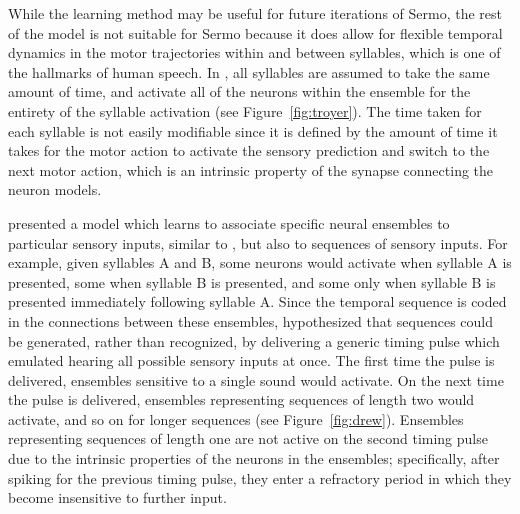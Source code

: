 
While the learning method
may be useful for future iterations of Sermo,
the rest of the model is not suitable for Sermo
because it does allow for
flexible temporal dynamics
in the motor trajectories within and between syllables,
which is one of the hallmarks of human speech.
In \citet{troyer2000},
all syllables are assumed
to take the same amount of time,
and activate all of the neurons
within the ensemble for the entirety
of the syllable activation
(see Figure~\ref{fig:troyer}).
The time taken for each syllable
is not easily modifiable since
it is defined by the amount of time
it takes for the motor action
to activate the sensory prediction
and switch to the next motor action,
which is an intrinsic property
of the synapse connecting the neuron models.

\citet{drew2003} presented a model
which learns to associate specific neural ensembles
to particular sensory inputs,
similar to \citet{troyer2000},
but also to sequences of sensory inputs.
For example, given syllables A and B,
some neurons would activate
when syllable A is presented,
some when syllable B is presented,
and some only when syllable B is presented
immediately following syllable A.
Since the temporal sequence is
coded in the connections between
these ensembles,
\citeauthor{drew2003} hypothesized that
sequences could be generated,
rather than recognized,
by delivering a generic timing pulse
which emulated hearing all possible sensory
inputs at once.
The first time the pulse is delivered,
ensembles sensitive to a single sound
would activate.
On the next time the pulse is delivered,
ensembles representing sequences of length two
would activate, and so on for longer sequences
(see Figure~\ref{fig:drew}).
Ensembles representing sequences of length one
are not active on the second timing pulse
due to the intrinsic properties
of the neurons in the ensembles;
specifically, after spiking
for the previous timing pulse,
they enter a refractory period
in which they become insensitive to further input.

